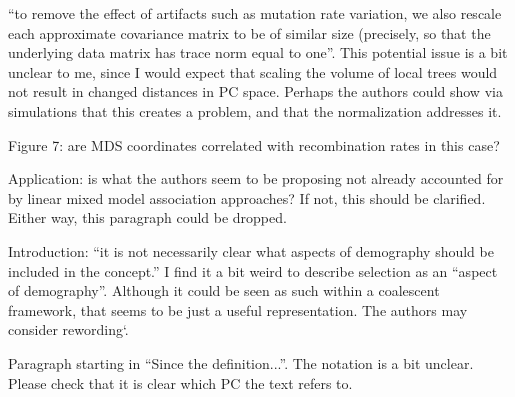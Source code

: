 \begin{point}{}
``to remove the effect of artifacts such as mutation rate variation, we also rescale each
approximate covariance matrix to be of similar size (precisely, so that the underlying data
matrix has trace norm equal to one''. This potential issue is a bit unclear to me, since I would
expect that scaling the volume of local trees would not result in changed distances in PC
space. Perhaps the authors could show via simulations that this creates a problem, and that the
normalization addresses it.
\end{point}

\begin{point}{Figure 7:}
are MDS coordinates correlated with recombination rates in this case?
\end{point}


\begin{point}{Application:}
 is what the authors seem to be proposing not already accounted for by linear
mixed model association approaches? If not, this should be clarified. Either way, this paragraph
could be dropped.
\end{point}

\begin{point}{Introduction:}
 ``it is not necessarily clear what aspects of demography should be included in the
concept.'' I find it a bit weird to describe selection as an ``aspect of demography''. Although it
could be seen as such within a coalescent framework, that seems to be just a useful
representation. The authors may consider rewording`.
\end{point}

\begin{point}{}
Paragraph starting in ``Since the definition...''. The notation is a bit unclear. Please check that it
is clear which PC the text refers to.
\end{point}

